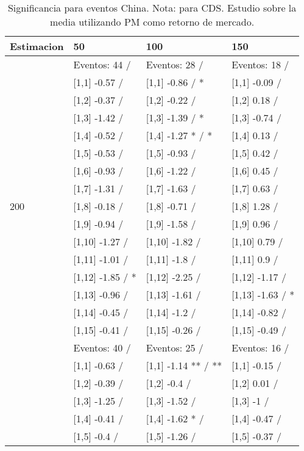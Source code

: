 \begin{table}

\caption{Significancia para eventos China. Nota: para CDS. Estudio sobre la media utilizando PM como retorno de mercado.}
\centering
\begin{tabular}[t]{llll}
\toprule
Estimacion & 50 & 100 & 150\\
\midrule
 & Eventos:  44 / & Eventos:  28 / & Eventos:  18 /\\
 & {}[1,1] -0.57  / & {}[1,1] -0.86  / * & {}[1,1] -0.09  /\\
 & {}[1,2] -0.37  / & {}[1,2] -0.22  / & {}[1,2] 0.18  /\\
 & {}[1,3] -1.42  / & {}[1,3] -1.39  / * & {}[1,3] -0.74  /\\
 & {}[1,4] -0.52  / & {}[1,4] -1.27 * / * & {}[1,4] 0.13  /\\
\addlinespace
 & {}[1,5] -0.53  / & {}[1,5] -0.93  / & {}[1,5] 0.42  /\\
 & {}[1,6] -0.93  / & {}[1,6] -1.22  / & {}[1,6] 0.45  /\\
 & {}[1,7] -1.31  / & {}[1,7] -1.63  / & {}[1,7] 0.63  /\\
200 & {}[1,8] -0.18  / & {}[1,8] -0.71  / & {}[1,8] 1.28  /\\
 & {}[1,9] -0.94  / & {}[1,9] -1.58  / & {}[1,9] 0.96  /\\
\addlinespace
 & {}[1,10] -1.27  / & {}[1,10] -1.82  / & {}[1,10] 0.79  /\\
 & {}[1,11] -1.01  / & {}[1,11] -1.8  / & {}[1,11] 0.9  /\\
 & {}[1,12] -1.85  / * & {}[1,12] -2.25  / & {}[1,12] -1.17  /\\
 & {}[1,13] -0.96  / & {}[1,13] -1.61  / & {}[1,13] -1.63  / *\\
 & {}[1,14] -0.45  / & {}[1,14] -1.2  / & {}[1,14] -0.82  /\\
\addlinespace
 & {}[1,15] -0.41  / & {}[1,15] -0.26  / & {}[1,15] -0.49  /\\
 & Eventos:  40 / & Eventos:  25 / & Eventos:  16 /\\
 & {}[1,1] -0.63  / & {}[1,1] -1.14 ** / ** & {}[1,1] -0.15  /\\
 & {}[1,2] -0.39  / & {}[1,2] -0.4  / & {}[1,2] 0.01  /\\
 & {}[1,3] -1.25  / & {}[1,3] -1.52  / & {}[1,3] -1  /\\
\addlinespace
 & {}[1,4] -0.41  / & {}[1,4] -1.62 * / & {}[1,4] -0.47  /\\
 & {}[1,5] -0.4  / & {}[1,5] -1.26  / & {}[1,5] -0.37  /\\

\end{tabular}
\end{table}
